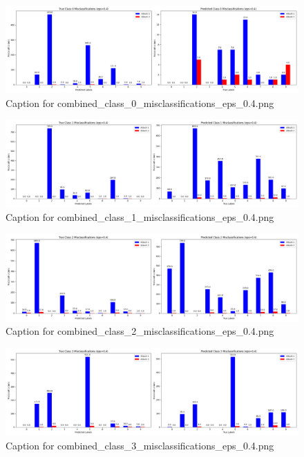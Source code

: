 \documentclass[11pt,onside]{article}
\begin{document}
\begin{figure}[ht]
\centering
\includegraphics[width=1\textwidth]{combined_class_boundary_pgd/combined_class_0_misclassifications_eps_0.4.png}
\caption{Caption for combined_class_0_misclassifications_eps_0.4.png}
\label{fig:combined_class_0_misclassifications_eps_0.4.png}
\end{figure}



\begin{figure}[ht]
\centering
\includegraphics[width=1\textwidth]{combined_class_boundary_pgd/combined_class_1_misclassifications_eps_0.4.png}
\caption{Caption for combined_class_1_misclassifications_eps_0.4.png}
\label{fig:combined_class_1_misclassifications_eps_0.4.png}
\end{figure}

\begin{figure}[ht]
\centering
\includegraphics[width=1\textwidth]{combined_class_boundary_pgd/combined_class_2_misclassifications_eps_0.4.png}
\caption{Caption for combined_class_2_misclassifications_eps_0.4.png}
\label{fig:combined_class_2_misclassifications_eps_0.4.png}
\end{figure}

\begin{figure}[ht]
\centering
\includegraphics[width=1\textwidth]{combined_class_boundary_pgd/combined_class_3_misclassifications_eps_0.4.png}
\caption{Caption for combined_class_3_misclassifications_eps_0.4.png}
\label{fig:combined_class_3_misclassifications_eps_0.4.png}
\end{figure}
\end{document}
